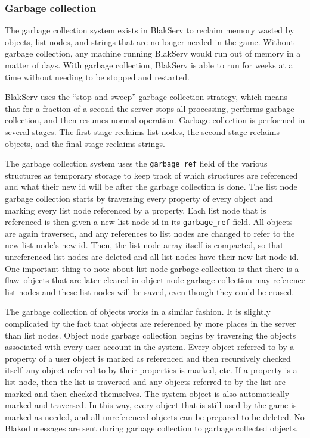 \subsubsection{Garbage collection}

The garbage collection system exists in BlakServ to reclaim memory wasted by
objects, list nodes, and strings that are no longer needed in the game.  Without
garbage collection, any machine running BlakServ would run out of memory in
a matter of days.  With garbage collection, BlakServ is able to run for weeks at a
time without needing to be stopped and restarted.  

BlakServ uses the ``stop and sweep'' 
garbage collection strategy, which means
that for a fraction of a second the server stops all processing, performs
garbage collection, and then resumes normal operation.
Garbage collection is performed in several stages.  The first stage reclaims
list nodes, the second stage reclaims objects, and the final stage reclaims
strings.

The garbage collection system uses the \texttt{garbage\_ref} field of the various
structures as temporary storage to keep track of which structures are referenced
and what their new id will be after the garbage collection is done.  The list node
garbage collection starts by traversing every property of every object and marking
every list node referenced by a property.  Each list node that is referenced is
then given a new list node id in its \texttt{garbage\_ref} field.  All objects
are again traversed, and any references to list nodes are changed to refer to the
new list node's new id.  Then, the list node array itself is compacted, so that
unreferenced list nodes are deleted and all list nodes have their new list node
id.  One important thing to note about list node garbage collection is that there
is a flaw--objects that are later cleared in object node garbage collection may
reference list nodes and these list nodes will be saved, even though they could
be erased.

The garbage collection of objects works in a similar fashion.  It is slightly
complicated by the fact that objects are referenced by more places in the server
than list nodes.  Object node garbage collection begins by traversing the objects
associated with every user account in the system.  Every object referred to by a property
of a user object is marked as referenced and then recursively checked itself--any object
referred to by their properties is marked, etc.  If a property is a list node,
then the list is traversed and any objects referred to by the list are marked and
then checked themselves.  The system object is also automatically marked and traversed.
In this way, every object that is still used by the game is marked as needed, and all
unreferenced objects can be prepared to be deleted.  No Blakod messages are sent
during garbage collection to garbage collected objects.

